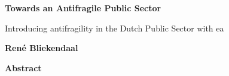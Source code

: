 \thispagestyle{plain}
{}
\begin{center}
	\Large
	\textbf{Towards an Antifragile Public Sector}
	
	\vspace{0.4cm}
	\large
	Introducing \Gls{antifragility} in the Dutch Public Sector with \gls{ea}
	
	\vspace{0.4cm}
	\textbf{René Bliekendaal}
	
	\vspace{0.9cm}
	\textbf{Abstract}
\end{center}

